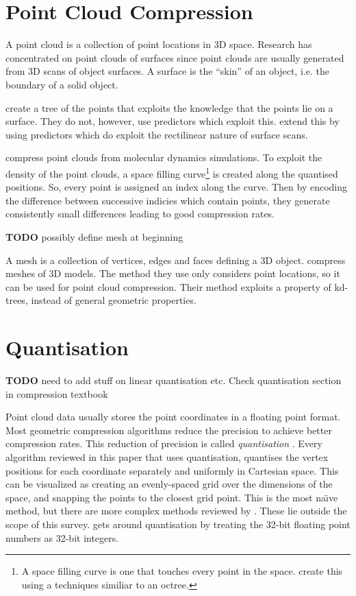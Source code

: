 \documentclass{report}
\newcommand{\todo}{\textbf{TODO} }
\begin{document}
\section{Point Cloud Compression}

A point cloud is a collection of point locations in 3D space. Research has
concentrated on point clouds of surfaces since point clouds are usually
generated from 3D scans of object surfaces. A surface is the ``skin'' of an
object, i.e. the boundary of a solid object.

\cite{gumholdcomp} create a tree of the points that exploits the knowledge
that the points lie on a surface. They do not, however, use predictors which
exploit this. \citet{merrycomp} extend this by using predictors which do
exploit the rectilinear nature of surface scans.

\citet{omeltchenko2000sls} compress point clouds from molecular dynamics
simulations. To exploit the density of the point clouds, a space filling
curve\footnote{A space filling curve is one that touches every point in the
  space. \citet{omeltchenko2000sls} create this using a techniques similiar to
  an octree.} is created along the quantised positions. So, every point is
assigned an index along the curve. Then by encoding the difference between
successive indicies which contain points, they generate consistently small
differences leading to good compression rates.

\todo possibly define mesh at beginning

A mesh is a collection of vertices, edges and faces defining a 3D
object. \citet{devillers2000gci} compress meshes of 3D models. The method they
use only considers point locations, so it can be used for point cloud
compression. Their method exploits a property of kd-trees, instead of general
geometric properties.


\section{Quantisation}

\todo need to add stuff on linear quantisation etc. Check quantisation section
in compression textbook

Point cloud data usually stores the point coordinates in a floating point
format. Most geometric compression algorithms reduce the precision to achieve
better compression rates. This reduction of precision is called
\emph{quantisation} \citep{ag-racm-03}. Every algorithm reviewed in this paper
that uses quantisation, quantises the vertex positions for each coordinate
separately and uniformly in Cartesian space. This can be visualized as
creating an evenly-spaced grid over the dimensions of the space, and snapping
the points to the closest grid point. This is the most na\"{\i}ve method, but
there are more complex methods reviewed by \citet{ag-racm-03}. These lie
outside the scope of this survey. \citet{chen2005lcp} gets around quantisation
by treating the 32-bit floating point numbers as 32-bit integers.
\end{document}
